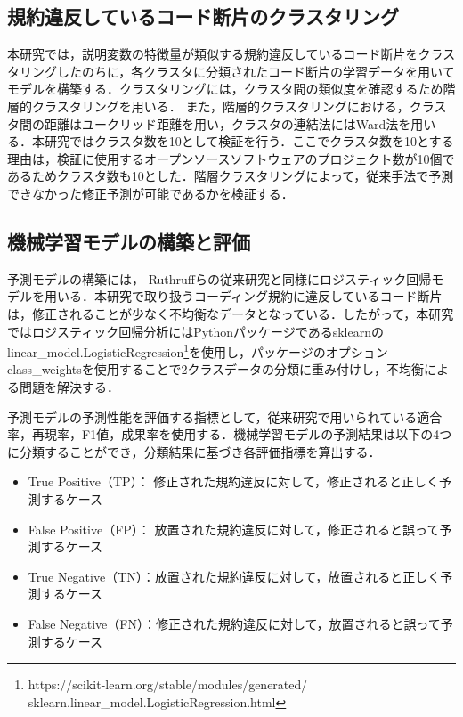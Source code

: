 \documentclass[T,J]{fose} %
\begin{document}
\subsection{規約違反しているコード断片のクラスタリング}

本研究では，説明変数の特徴量が類似する規約違反しているコード断片をクラスタリングしたのちに，各クラスタに分類されたコード断片の学習データを用いてモデルを構築する．クラスタリングには，クラスタ間の類似度を確認するため階層的クラスタリングを用いる．
また，階層的クラスタリングにおける，クラスタ間の距離はユークリッド距離を用い，クラスタの連結法にはWard法を用いる．本研究ではクラスタ数を10として検証を行う．ここでクラスタ数を10とする理由は，検証に使用するオープンソースソフトウェアのプロジェクト数が10個であるためクラスタ数も10とした．階層クラスタリングによって，従来手法で予測できなかった修正予測が可能であるかを検証する．


\subsection{機械学習モデルの構築と評価}

予測モデルの構築には，
Ruthruffらの従来研究と同様にロジスティック回帰モデルを用いる．\cite{JyuraiPre}本研究で取り扱うコーディング規約に違反しているコード断片は，修正されることが少なく不均衡なデータとなっている．したがって，本研究ではロジスティック回帰分析にはPythonパッケージであるsklearnのlinear\_model.LogisticRegression\footnote{https://scikit-learn.org/stable/modules/generated/\\sklearn.linear\_model.LogisticRegression.html}を使用し，パッケージのオプションclass\_weightsを使用することで2クラスデータの分類に重み付けし，不均衡による問題を解決する．

予測モデルの予測性能を評価する指標として，従来研究で用いられている適合率，再現率，F1値，成果率を使用する．機械学習モデルの予測結果は以下の4つに分類することができ，分類結果に基づき各評価指標を算出する．
\begin{itemize}
\item True Positive（TP）： 修正された規約違反に対して，修正されると正しく予測するケース
\item False Positive（FP）： 放置された規約違反に対して，修正されると誤って予測するケース
\item True Negative（TN）：放置された規約違反に対して，放置されると正しく予測するケース
\item False Negative（FN）：修正された規約違反に対して，放置されると誤って予測するケース
\end{itemize}
\end{document}
